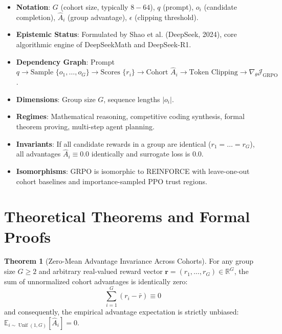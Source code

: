\documentclass[11pt,a4paper]{article}
\theoremstyle{definition}
\newtheorem{theorem}{\textbf{Theorem}}[section]
\begin{document}
\begin{itemize}
    \item \textbf{Notation}: $G$ (cohort size, typically $8 - 64$), $q$ (prompt), $o_i$ (candidate completion), $\hat{A}_i$ (group advantage), $\epsilon$ (clipping threshold).
    \item \textbf{Epistemic Status}: Formulated by Shao et al. (DeepSeek, 2024), core algorithmic engine of DeepSeekMath and DeepSeek-R1.
    \item \textbf{Dependency Graph}: Prompt $q \to \text{Sample } \{o_1, \dots, o_G\} \to \text{Scores } \{r_i\} \to \text{Cohort } \hat{A}_i \to \text{Token Clipping} \to \nabla_\theta \mathcal{J}_{\text{GRPO}}$.
    \item \textbf{Dimensions}: Group size $G$, sequence lengths $|o_i|$.
    \item \textbf{Regimes}: Mathematical reasoning, competitive coding synthesis, formal theorem proving, multi-step agent planning.
    \item \textbf{Invariants}: If all candidate rewards in a group are identical ($r_1 = \dots = r_G$), all advantages $\hat{A}_i \equiv 0.0$ identically and surrogate loss is $0.0$.
    \item \textbf{Isomorphisms}: GRPO is isomorphic to REINFORCE with leave-one-out cohort baselines and importance-sampled PPO trust regions.
\end{itemize}

\section{Theoretical Theorems and Formal Proofs}

\begin{theorem}[Zero-Mean Advantage Invariance Across Cohorts]
For any group size $G \ge 2$ and arbitrary real-valued reward vector $\mathbf{r} = (r_1, \dots, r_G) \in \mathbb{R}^G$, the sum of unnormalized cohort advantages is identically zero:
{\boldmath
\begin{equation}
\sum_{i=1}^G (r_i - \bar{r}) \equiv 0
\end{equation}
}
and consequently, the empirical advantage expectation is strictly unbiased: $\mathbb{E}_{i \sim \operatorname{Unif}(1, G)}[\hat{A}_i] = 0$.
\end{theorem}
\end{document}
